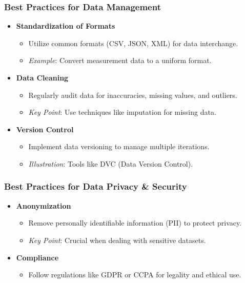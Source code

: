 \documentclass[aspectratio=169]{beamer}
\begin{document}
\begin{frame}[fragile]
    \frametitle{Best Practices for Data Management}
    \begin{itemize}
        \item \textbf{Standardization of Formats}
            \begin{itemize}
                \item Utilize common formats (CSV, JSON, XML) for data interchange.
                \item \textit{Example}: Convert measurement data to a uniform format.
            \end{itemize}
        \item \textbf{Data Cleaning}
            \begin{itemize}
                \item Regularly audit data for inaccuracies, missing values, and outliers.
                \item \textit{Key Point}: Use techniques like imputation for missing data.
            \end{itemize}
        \item \textbf{Version Control}
            \begin{itemize}
                \item Implement data versioning to manage multiple iterations.
                \item \textit{Illustration}: Tools like DVC (Data Version Control).
            \end{itemize}
    \end{itemize}
\end{frame}

\begin{frame}[fragile]
    \frametitle{Best Practices for Data Privacy \& Security}
    \begin{itemize}
        \item \textbf{Anonymization}
            \begin{itemize}
                \item Remove personally identifiable information (PII) to protect privacy.
                \item \textit{Key Point}: Crucial when dealing with sensitive datasets.
            \end{itemize}
        \item \textbf{Compliance}
            \begin{itemize}
                \item Follow regulations like GDPR or CCPA for legality and ethical use.
            \end{itemize}
    \end{itemize}
\end{frame}
\end{document}
